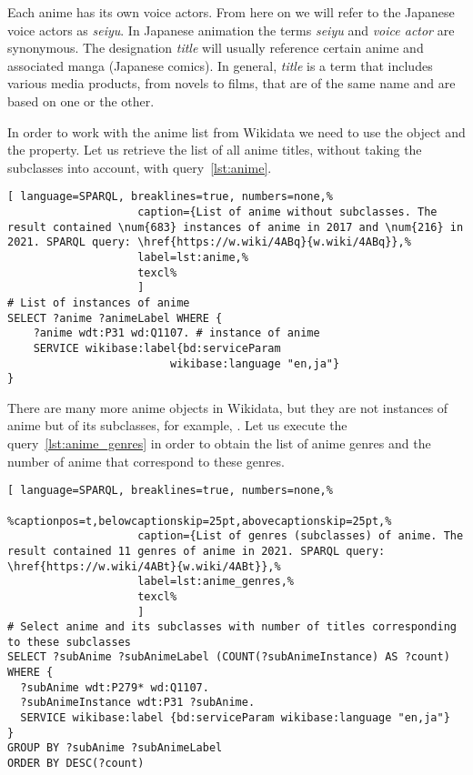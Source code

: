 Each anime has its own voice actors. From here on we will refer to the Japanese voice actors as \emph{seiyu}. In Japanese animation the terms \emph{seiyu} and \emph{voice actor} are synonymous. The designation \emph{title} will usually reference certain anime and associated manga (Japanese comics). In general, \emph{title} is a term that includes various media products, from novels to films, that are of the same name and are based on one or the other.

In order to work with the anime list from Wikidata we need to use the  object and the  property. Let us retrieve the list of all anime titles, without taking the subclasses into account, with query~\ref{lst:anime}.

\begin{lstlisting}[ language=SPARQL, breaklines=true, numbers=none,%
                    caption={List of anime without subclasses. The result contained \num{683} instances of anime in 2017 and \num{216} in 2021. SPARQL query: \href{https://w.wiki/4ABq}{w.wiki/4ABq}},%
                    label=lst:anime,%
                    texcl%
                    ]
# List of instances of anime
SELECT ?anime ?animeLabel WHERE {
    ?anime wdt:P31 wd:Q1107. # instance of anime
    SERVICE wikibase:label{bd:serviceParam
					     wikibase:language "en,ja"}
}
\end{lstlisting}%

There are many more anime objects in Wikidata, but they are not instances of anime but of its subclasses, for example, . Let us execute the query~\ref{lst:anime_genres} in order to obtain the list of anime genres and the number of anime that correspond to these genres.

\begin{widepar}%
	\captionsetup[lstlisting]{%
        format=llapwide18 %
	}%
\begin{lstlisting}[ language=SPARQL, breaklines=true, numbers=none,%
                    %captionpos=t,belowcaptionskip=25pt,abovecaptionskip=25pt,%
                    caption={List of genres (subclasses) of anime. The result contained 11 genres of anime in 2021. SPARQL query: \href{https://w.wiki/4ABt}{w.wiki/4ABt}},%
                    label=lst:anime_genres,%
                    texcl%
                    ]
# Select anime and its subclasses with number of titles corresponding to these subclasses
SELECT ?subAnime ?subAnimeLabel (COUNT(?subAnimeInstance) AS ?count) WHERE {
  ?subAnime wdt:P279* wd:Q1107.
  ?subAnimeInstance wdt:P31 ?subAnime.
  SERVICE wikibase:label {bd:serviceParam wikibase:language "en,ja"}
}
GROUP BY ?subAnime ?subAnimeLabel
ORDER BY DESC(?count)
\end{lstlisting}%
\end{widepar}%

